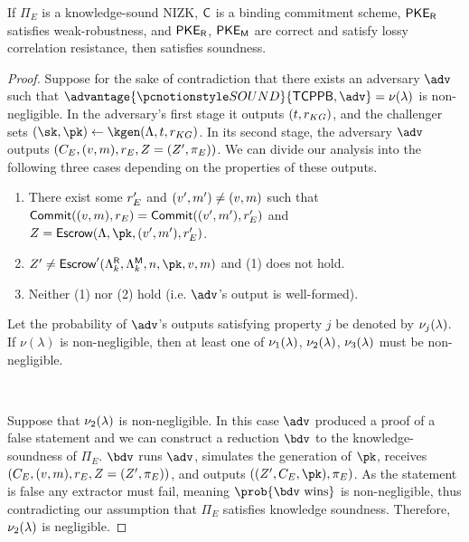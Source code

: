 \begin{lemma}
	\label{lemma:main-soundness}
	If $\Pi_{E}$ is a knowledge-sound NIZK, $\mathsf{C}$ is a binding commitment scheme, ${{\mathsf{PKE}_{{\mathsf{R}}}}}$ satisfies weak-robustness, and ${{\mathsf{PKE}_{{\mathsf{R}}}}}$, ${{\mathsf{PKE}_{{\mathsf{M}}}}}$ are correct and satisfy lossy correlation resistance, then \schemename{} satisfies soundness.
\end{lemma}

\begin{proof}
	Suppose for the sake of contradiction that there exists an adversary $\adv$ such that $\advantage{\soundgame}{\mathsf{TCPPB}, \adv} = \nu(\secpar)$ is non-negligible.
	In the adversary's first stage it outputs $(t, r_{KG})$, and the challenger sets $(\sk, \pk) \leftarrow \kgen(\ppbpp, \thr, \kgr)$.
	In its second stage, the adversary $\adv$ outputs $(C_{E}, (v, m), r_{E}, Z = (Z', \pi_{E}))$.
	We can divide our analysis into the following three cases depending on the properties of these outputs.
	\begin{enumerate}
		\item There exist some $r_{E}'$ and $(v', m') \neq (v, m)$ such that ${\sf Commit}((v, m), r_{E}) = \allowbreak{\sf Commit}(\allowbreak(\allowbreak v',\allowbreak m'),\allowbreak r_{E}')$ and $\esc = \escrow(\ppbpp, \pk, (\uval', \msg'), \er')$.
		\item $Z' \neq \escrow'(\pkerpp, \pkempp, \numdigits, \pk, \uval, \msg)$ and (1) does not hold.
		\item Neither (1) nor (2) hold (i.e. $\adv$'s output is well-formed).
	\end{enumerate}
	Let the probability of $\adv$'s outputs satisfying property $j$ be denoted by $\nu_j(\lambda)$.
	If $\nu(\lambda)$ is non-negligible, then at least one of $\nu_1(\lambda)$, $\nu_2(\lambda)$, $\nu_3(\lambda)$ must be non-negligible.

	${}$

	Suppose that $\nu_2(\lambda)$ is non-negligible.
	In this case $\adv$ produced a proof of a false statement and we can construct a reduction $\bdv$ to the knowledge-soundness of $\Pi_{E}$.
	$\bdv$ runs $\adv$, simulates the generation of $\pk$, receives $(C_{E}, (v, m), r_{E}, Z = (Z', \pi_{E}))$, and outputs $((Z', \ecom, \pk), \zkproof_{E})$.
	As the statement is false any extractor must fail, meaning $\prob{\bdv \text{ wins}}$ is non-negligible, thus contradicting our assumption that $\Pi_{E}$ satisfies knowledge soundness.
	Therefore, $\nu_2(\lambda)$ is negligible.


\end{proof}
